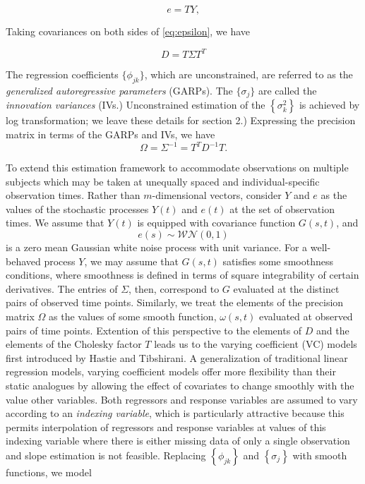 \documentclass[12pt]{article}
\theoremstyle{definition}
\begin{document}
\begin{equation}
e = T Y, \label{eq:epsilon}
\end{equation}
\noindent

Taking covariances on both sides of \ref{eq:epsilon}, we have

\begin{equation}
\nonumber
D = T \Sigma T^T
\end{equation} 

The regression coefficients $\lbrace \phi_{jk} \rbrace$, which are unconstrained, are referred to as the \emph{generalized autoregressive parameters} (GARPs). The $\lbrace \sigma_{j} \rbrace$ are called the \emph{innovation variances} (IVs.)  Unconstrained estimation of the $\left\{ \sigma_{k}^2 \right\}$ is achieved by log transformation;  we leave these details for section 2.) Expressing the precision matrix  in terms of the GARPs and IVs, we have
\begin{equation} \label{eq:omega_decomp}
\Omega= \Sigma^{-1} = T^T D^{-1} T.
\end{equation}

To extend this estimation framework to accommodate observations on multiple subjects which may be taken at unequally spaced and individual-specific observation times. Rather than $m$-dimensional vectors, consider $Y$ and $e$ as the values of the stochastic processes $Y\left(t\right)$ and $e\left(t\right)$ at the set of observation times.  We assume that $Y\left(t\right)$ is equipped with covariance function $G\left(s,t\right)$, and
\[
e\left(s\right) \sim \mathcal{WN}\left(0,1\right)
\] 
is a zero mean Gaussian white noise process with unit variance. For a well-behaved process $Y$, we may assume that $G\left(s,t\right)$ satisfies some smoothness conditions, where smoothness is defined in terms of square integrability of certain derivatives. The entries of $\Sigma$, then, correspond to $G$ evaluated at the distinct pairs of observed time points. Similarly, we treat the elements of the precision matrix $\Omega$ as the values of some smooth function, $\omega\left(s,t\right)$ evaluated at observed pairs of time points. Extention of this perspective to the elements of $D$ and the elements of the Cholesky factor $T$ leads us to  %
the varying coefficient (VC) models first introduced by Hastie and Tibshirani. A generalization of traditional linear regression models, varying coefficient models offer more flexibility than their static analogues by allowing the effect of covariates to change smoothly with the value other variables. Both regressors and response variables are assumed to vary according to an \emph{indexing variable}, which is particularly attractive because this permits interpolation of regressors and response variables at values of this indexing variable where there is either missing data of only a single observation and slope estimation is not feasible. Replacing  $\left \{ \phi_{jk} \right\}$ and $\left\{ \sigma_j \right\}$ with smooth functions, we model 
\end{document}
